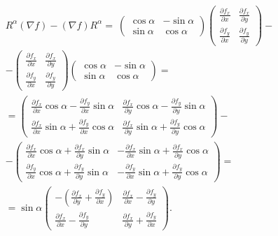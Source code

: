 \begin{multline}
\label{formula:ugly_commutant}
  R^\alpha (\nabla f) - (\nabla f) R^\alpha =\
  \begin{pmatrix} 
    \cos \alpha & -\sin \alpha \\ 
    \sin \alpha & \cos \alpha 
  \end{pmatrix} 
  \begin{pmatrix} 
    \frac{\partial f_x}{\partial x} & \frac{\partial f_x}{\partial y} \\
    \frac{\partial f_y}{\partial x} & \frac{\partial f_y}{\partial y} 
  \end{pmatrix} - \\
  - \begin{pmatrix} 
    \frac{\partial f_x}{\partial x} & \frac{\partial f_x}{\partial y} \\
    \frac{\partial f_y}{\partial x} & \frac{\partial f_y}{\partial y} 
  \end{pmatrix}
  \begin{pmatrix} 
    \cos \alpha & -\sin \alpha \\
    \sin \alpha & \cos \alpha 
  \end{pmatrix} = \\
  = \begin{pmatrix}
    \frac{\partial f_x}{\partial x} \cos \alpha - \frac{\partial f_y}{\partial x} \sin \alpha &
    \frac{\partial f_x}{\partial y} \cos \alpha - \frac{\partial f_y}{\partial y} \sin \alpha \\
    \frac{\partial f_x}{\partial x} \sin \alpha + \frac{\partial f_y}{\partial x} \cos \alpha &
    \frac{\partial f_x}{\partial y} \sin \alpha + \frac{\partial f_y}{\partial y} \cos \alpha 
  \end{pmatrix} - \\
  - \begin{pmatrix} 
    \frac{\partial f_x}{\partial x} \cos \alpha + \frac{\partial f_x}{\partial y} \sin \alpha &
    - \frac{\partial f_x}{\partial x} \sin \alpha + \frac{\partial f_x}{\partial y} \cos \alpha \\
    \frac{\partial f_y}{\partial x} \cos \alpha + \frac{\partial f_y}{\partial y} \sin \alpha &
    - \frac{\partial f_y}{\partial x} \sin \alpha + \frac{\partial f_y}{\partial y} \cos \alpha 
  \end{pmatrix} = \\
  = \sin \alpha \begin{pmatrix}
    -(\frac{\partial f_x}{\partial y} + \frac{\partial f_y}{\partial x}) &
    \frac{\partial f_x}{\partial x} - \frac{\partial f_y}{\partial y} \\
    \frac{\partial f_x}{\partial x} - \frac{\partial f_y}{\partial y} &
    \frac{\partial f_x}{\partial y} + \frac{\partial f_y}{\partial x} 
  \end{pmatrix}.
\end{multline}

